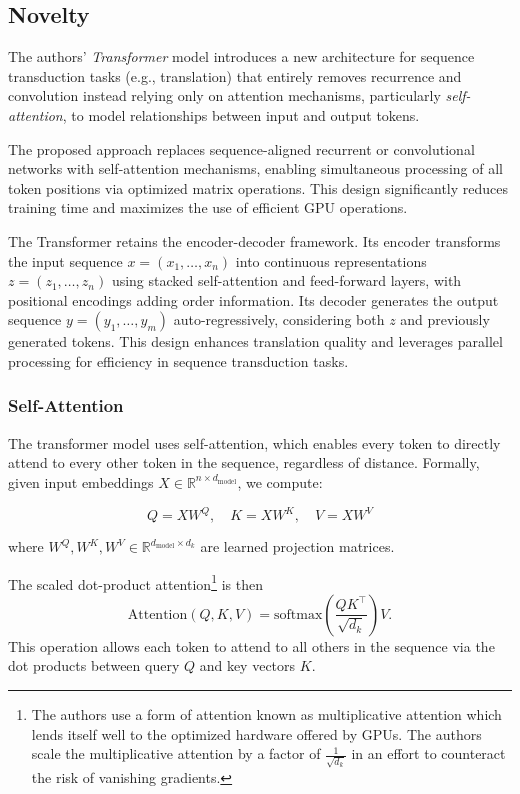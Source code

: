 \documentclass[10pt]{article}
\begin{document}
\subsection*{Novelty}

The authors' \textit{Transformer} model introduces a new architecture for sequence transduction tasks (e.g., translation) that entirely removes recurrence and convolution instead relying only on attention mechanisms, particularly \textit{self-attention}, to model relationships between input and output tokens.

The proposed approach replaces sequence-aligned recurrent or convolutional networks with self-attention mechanisms, enabling simultaneous processing of all token positions via optimized matrix operations. This design significantly reduces training time and maximizes the use of efficient GPU operations.

The Transformer retains the encoder-decoder framework. Its encoder transforms the input sequence \(x = (x_1, \dots, x_n)\) into continuous representations \(z = (z_1, \dots, z_n)\) using stacked self-attention and feed-forward layers, with positional encodings adding order information. Its decoder generates the output sequence \(y = (y_1, \dots, y_m)\) auto-regressively, considering both \(z\) and previously generated tokens. This design enhances translation quality and leverages parallel processing for efficiency in sequence transduction tasks.


\subsubsection*{Self-Attention}
The transformer model uses self-attention, which enables every token to directly attend to every other token in the sequence, regardless of distance. Formally, given input embeddings $X \in \mathbb{R}^{n \times d_{\text{model}}}$, we compute:

\[
    Q = XW^Q, \quad K = XW^K, \quad V = XW^V
\]

where $W^Q, W^K, W^V \in \mathbb{R}^{d_{\text{model}} \times d_k}$ are learned projection matrices.

The scaled dot-product attention\footnote{The authors use a form of attention known as multiplicative attention which lends itself well to the optimized hardware offered by GPUs. The authors scale the multiplicative attention by a factor of \(\frac{1}{\sqrt{d_k}}\) in an effort to counteract the risk of vanishing gradients.} is then
\[
    \text{Attention}(Q, K, V) = \text{softmax}\left( \frac{QK^\top}{\sqrt{d_k}} \right) V.
\]
This operation allows each token to attend to all others in the sequence via the dot products between query \(Q\) and key vectors \(K\).
\end{document}
